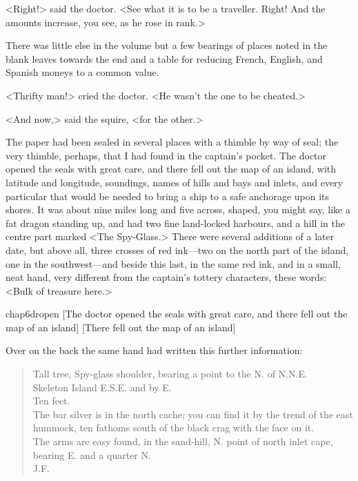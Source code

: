 <Right!> said the doctor. <See what it is to be a traveller. Right! And the amounts increase, you see, as he rose in rank.>

There was little else in the volume but a few bearings of places noted in the blank leaves towards the end and a table for reducing French, English, and Spanish moneys to a common value.

<Thrifty man!> cried the doctor. <He wasn't the one to be cheated.>

<And now,> said the squire, <for the other.>

 
The paper had been sealed in several places with a thimble by way of seal; the very thimble, perhaps, that I had found in the captain's pocket. The doctor opened the seals with great care, and there fell out the map of an island, with latitude and longitude, soundings, names of hills and bays and inlets, and every particular that would be needed to bring a ship to a safe anchorage upon its shores. It was about nine miles long and five across, shaped, you might say, like a fat dragon standing up, and had two fine land-locked harbours, and a hill in the centre part marked <The Spy-Glass.> There were several additions of a later date, but above all, three crosses of red ink—two on the north part of the island, one in the southwest—and beside this last, in the same red ink, and in a small, neat hand, very different from the captain's tottery characters, these words: <Bulk of treasure here.>


\begin{bwbigpic}
	[\basicscale]
	{chap6dropen}
	[The doctor opened the seals with great care, and there fell out the map of an island]
	[There fell out the map of an island]
\end{bwbigpic}

Over on the back the same hand had written this further information:

\blockquote{
Tall tree, Spy-glass shoulder, bearing a point to the N\@. of N\@.N\@.E\@.\\
Skeleton Island E\@.S\@.E\@. and by E\@.\\
Ten feet.\\
The bar silver is in the north cache; you can find it by the trend of the east hummock, ten fathoms south of the black crag with the face on it.\\
The arms are easy found, in the sand-hill, N\@. point of north inlet cape, bearing E\@. and a quarter N\@.\\
\textsc{J\@.F\@.}}

